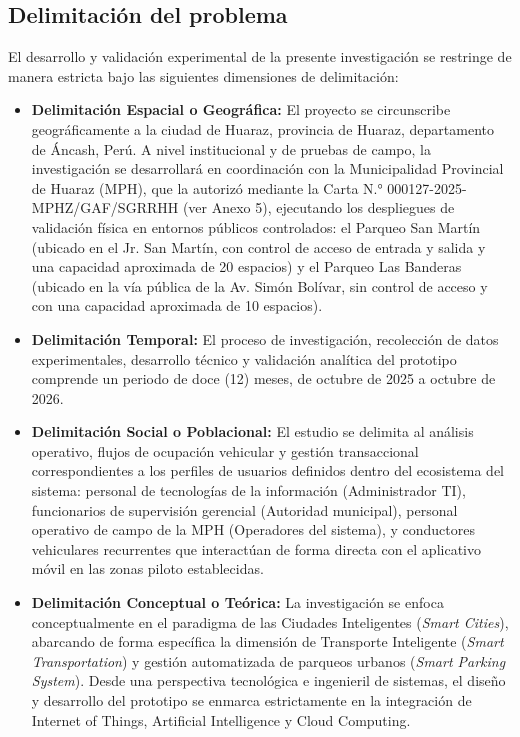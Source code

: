 \documentclass[12pt,a4paper]{article}
\begin{document}
\subsection{Delimitación del problema}

El desarrollo y validación experimental de la presente investigación se restringe de manera estricta bajo las siguientes dimensiones de delimitación:

\begin{itemize}[leftmargin=*]
	\item \textbf{Delimitación Espacial o Geográfica:} El proyecto se circunscribe geográficamente a la ciudad de Huaraz, provincia de Huaraz, departamento de Áncash, Perú. A nivel institucional y de pruebas de campo, la investigación se desarrollará en coordinación con la Municipalidad Provincial de Huaraz (MPH), que la autorizó mediante la Carta N.° 000127-2025-MPHZ/GAF/SGRRHH (ver Anexo 5), ejecutando los despliegues de validación física en entornos públicos controlados: el Parqueo San Martín (ubicado en el Jr. San Martín, con control de acceso de entrada y salida y una capacidad aproximada de 20 espacios) y el Parqueo Las Banderas (ubicado en la vía pública de la Av. Simón Bolívar, sin control de acceso y con una capacidad aproximada de 10 espacios).
	
	\item \textbf{Delimitación Temporal:} El proceso de investigación, recolección de datos experimentales, desarrollo técnico y validación analítica del prototipo comprende un periodo de doce (12) meses, de octubre de 2025 a octubre de 2026.
	
	\item \textbf{Delimitación Social o Poblacional:} El estudio se delimita al análisis operativo, flujos de ocupación vehicular y gestión transaccional correspondientes a los perfiles de usuarios definidos dentro del ecosistema del sistema: personal de tecnologías de la información (Administrador TI), funcionarios de supervisión gerencial (Autoridad municipal), personal operativo de campo de la MPH (Operadores del sistema), y conductores vehiculares recurrentes que interactúan de forma directa con el aplicativo móvil en las zonas piloto establecidas.
	
	\item \textbf{Delimitación Conceptual o Teórica:} La investigación se enfoca conceptualmente en el paradigma de las Ciudades Inteligentes (\textit{Smart Cities}), abarcando de forma específica la dimensión de Transporte Inteligente (\textit{Smart Transportation}) y gestión automatizada de parqueos urbanos (\textit{Smart Parking System}). Desde una perspectiva tecnológica e ingenieril de sistemas, el diseño y desarrollo del prototipo se enmarca estrictamente en la integración de Internet of Things, Artificial Intelligence y Cloud Computing.
\end{itemize}
\end{document}
